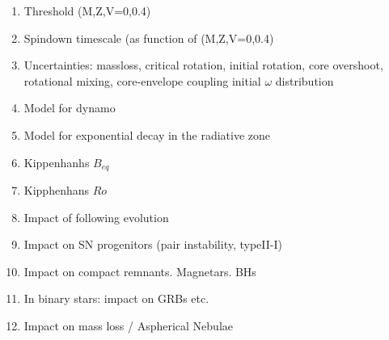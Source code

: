 \begin{enumerate}
\item Threshold (M,Z,V=0,0.4)
\item Spindown timescale (as function of (M,Z,V=0,0.4)
\item Uncertainties: massloss, critical rotation, initial rotation, core overshoot, rotational mixing, core-envelope coupling initial $\omega$ distribution  
\item Model for dynamo
\item Model for exponential decay in the radiative zone
\item Kippenhanhs $B_{eq}$
\item Kipphenhans $Ro$
\item Impact of following evolution
\item Impact on SN progenitors (pair instability, typeII-I)
\item Impact on compact remnants. Magnetars. BHs 
\item In binary stars: impact on GRBs etc.
\item Impact on mass loss / Aspherical Nebulae
\end{enumerate}